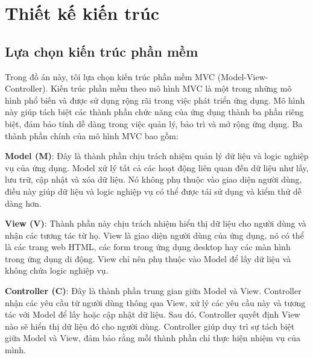 \documentclass[../DoAn.tex]{subfiles}
\begin{document}
\section{Thiết kế kiến trúc}
\subsection{Lựa chọn kiến trúc phần mềm}

Trong đồ án này, tôi lựa chọn kiến trúc phần mềm MVC (Model-View-Controller).
Kiến trúc phần mềm theo mô hình MVC là một trong những mô hình phổ biến và được sử dụng rộng rãi trong việc phát triển ứng dụng. Mô hình này giúp tách biệt các thành phần chức năng của ứng dụng thành ba phần riêng biệt, đảm bảo tính dễ dàng trong việc quản lý, bảo trì và mở rộng ứng dụng. Ba thành phần chính của mô hình MVC bao gồm:

\textbf{Model (M)}: Đây là thành phần chịu trách nhiệm quản lý dữ liệu và logic nghiệp vụ của ứng dụng. Model xử lý tất cả các hoạt động liên quan đến dữ liệu như lấy, lưu trữ, cập nhật và xóa dữ liệu. Nó không phụ thuộc vào giao diện người dùng, điều này giúp dữ liệu và logic nghiệp vụ có thể được tái sử dụng và kiểm thử dễ dàng hơn.

\textbf{View (V)}: Thành phần này chịu trách nhiệm hiển thị dữ liệu cho người dùng và nhận các tương tác từ họ. View là giao diện người dùng của ứng dụng, nó có thể là các trang web HTML, các form trong ứng dụng desktop hay các màn hình trong ứng dụng di động. View chỉ nên phụ thuộc vào Model để lấy dữ liệu và không chứa logic nghiệp vụ.

\textbf{Controller (C)}: Đây là thành phần trung gian giữa Model và View. Controller nhận các yêu cầu từ người dùng thông qua View, xử lý các yêu cầu này và tương tác với Model để lấy hoặc cập nhật dữ liệu. Sau đó, Controller quyết định View nào sẽ hiển thị dữ liệu đó cho người dùng. Controller giúp duy trì sự tách biệt giữa Model và View, đảm bảo rằng mỗi thành phần chỉ thực hiện nhiệm vụ của mình.
\end{document}
